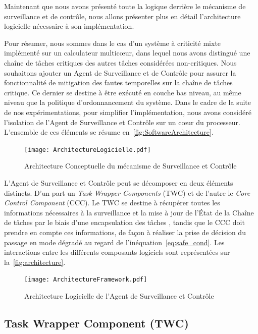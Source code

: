 \documentclass[french, a4paper, 11pt, twoside, pdftex]{StyleThese}
\begin{document}
	Maintenant que nous avons présenté toute la logique derrière le mécanisme de surveillance et de contrôle, nous allons présenter plus en détail l'architecture logicielle nécessaire à son implémentation.
	
	Pour résumer, nous sommes dans le cas d'un système à criticité mixte implémenté sur un calculateur multicœur, dans lequel nous avons distingué une chaîne de tâches critiques des autres tâches considérées non-critiques. Nous souhaitons ajouter un Agent de Surveillance et de Contrôle pour assurer la fonctionnalité de mitigation des fautes temporelles sur la chaîne de tâches critique. Ce dernier se destine à être exécuté en couche bas niveau, au même niveau que la politique d'ordonnancement du système. Dans le cadre de la suite de nos expérimentations, pour simplifier l'implémentation, nous avons considéré l'isolation de l'Agent de Surveillance et Contrôle sur un cœur du processeur. L'ensemble de ces éléments se résume en~\autoref{fig:SoftwareArchitecture}.

	\begin{figure}[ht]
        \centering
        \texttt{[image: ArchitectureLogicielle.pdf]}
        \caption{Architecture Conceptuelle du mécanisme de Surveillance et Contrôle} \label{fig:SoftwareArchitecture}
	\end{figure}

	L'Agent de Surveillance et Contrôle peut se décomposer en deux éléments distincts. D'un part un \emph{Task Wrapper Components} (TWC) et de l'autre le \emph{Core Control Component} (CCC). Le TWC se destine à récupérer toutes les informations nécessaires à la surveillance et la mise à jour de l'État de la Chaîne de tâches par le biais d'une encapsulation des tâches , tandis que le CCC doit prendre en compte ces informations, de façon à réaliser la prise de décision du passage en mode dégradé au regard de l'inéquation~\ref{eq:safe_cond}. Les interactions entre les différents composants logiciels sont représentées sur la~\autoref{fig:architecture}.
	
	
        \begin{figure}[ht!]
            \centering
            \texttt{[image: ArchitectureFramework.pdf]}
            \caption{Architecture Logicielle de l'Agent de Surveillance et Contrôle}
            \label{fig:architecture}
        \end{figure}
        
        
        \subsection{Task Wrapper Component (TWC)} 
        
\end{document}
